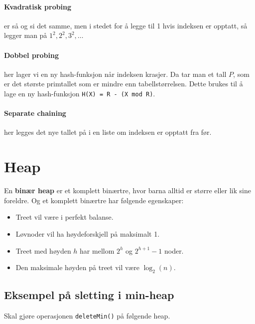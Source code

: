 \documentclass[11pt,a4paper]{article}
\theoremstyle{def}
\begin{document}
\paragraph{Kvadratisk probing} er så og si det samme, men i stedet for å legge til 1 hvis indeksen er opptatt, så legger man på $1^2, 2^2, 3^2,\dots$

\paragraph{Dobbel probing} her lager vi en ny hash-funksjon når indeksen krasjer. Da tar man et tall $P$, som er det største primtallet som er mindre enn tabellstørrelsen. Dette brukes til å lage en ny hash-funksjon \texttt{H(X) = R - (X mod R)}.

\paragraph{Separate chaining} her legges det nye tallet på i en liste om indeksen er opptatt fra før.


\newpage

\section{Heap}

En \textbf{binær heap} er et komplett binærtre, hvor barna alltid er større eller lik sine foreldre. Og et komplett binærtre har følgende egenskaper:

\begin{itemize}
\item
Treet vil være i perfekt balanse.
\item
Løvnoder vil ha høydeforskjell på maksimalt 1.
\item
Treet med høyden $h$ har mellom $2^h$ og $2^{h+1}-1$ noder.
\item
Den maksimale høyden på treet vil være $\log_2(n)$.
\end{itemize}

\subsection{Eksempel på sletting i min-heap}
Skal gjøre operasjonen \texttt{deleteMin()} på følgende heap.
\end{document}
